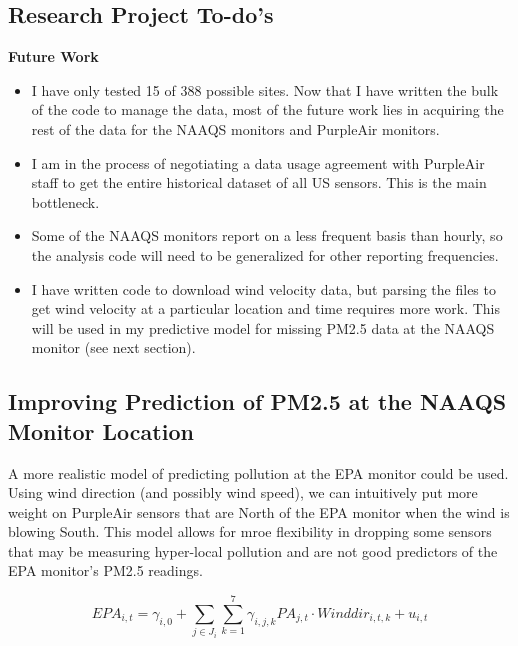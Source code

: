 \documentclass[12pt]{article}
\begin{document}
\subsection{Research Project To-do's} \label{sec:todo}
\textbf{Future Work}
\begin{itemize}
    \item I have only tested 15 of 388 possible sites. Now that I have written the bulk of the code to manage the data, most of the future work lies in acquiring the rest of the data for the NAAQS monitors and PurpleAir monitors.
    \item I am in the process of negotiating a data usage agreement with PurpleAir staff to get the entire historical dataset of all US sensors. This is the main bottleneck.
    \item Some of the NAAQS monitors report on a less frequent basis than hourly, so the analysis code will need to be generalized for other reporting frequencies.
    \item I have written code to download wind velocity data, but parsing the files to get wind velocity at a particular location and time requires more work. This will be used in my predictive model for missing PM2.5 data at the NAAQS monitor (see next section).
\end{itemize}

\subsection{Improving Prediction of PM2.5 at the NAAQS Monitor Location} \label{sec:app-prediction}


A more realistic model of predicting pollution at the EPA monitor could be used. Using wind direction (and possibly wind speed), we can intuitively put more weight on PurpleAir sensors that are North of the EPA monitor when the wind is blowing South. This model allows for mroe flexibility in dropping some sensors that may be measuring hyper-local pollution and are not good predictors of the EPA monitor's PM2.5 readings.

\[
EPA_{i,t} = \gamma_{i,0} + \sum\limits_{j\in J_i}\sum\limits_{k=1}^7\gamma_{i,j,k} 
PA_{j,t} \cdot Winddir_{i,t,k} + u_{i,t}
\]
\end{document}
